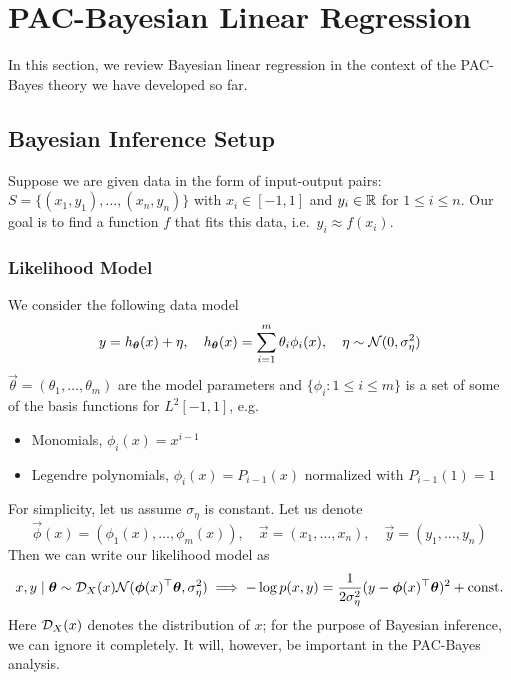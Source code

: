\section{PAC-Bayesian Linear Regression}

In this section, we review Bayesian linear regression in the context of the
PAC-Bayes theory we have developed so far.

\subsection{Bayesian Inference Setup}

Suppose we are given data in the form of input-output pairs: $S = \{(x_1, y_1),
\ldots, (x_n, y_n)\}$ with $x_i \in [-1, 1]$ and $y_i \in \mathbb{R}$ for $1 \leq i
\leq n$. Our goal is to find a function $f$ that fits this data, i.e.\ $y_i
\approx f(x_i)$.

\subsubsection{Likelihood Model}

We consider the following data model
\begin{equation}
  y = h_{\bm{\theta}}(x) + \eta, \quad h_{\bm{\theta}}(x) = \sum_{i = 1}^m
  \theta_i \phi_i(x), \quad \eta \sim \mathcal{N}(0, \sigma_\eta^2)
\end{equation}
$\Vec{\theta} = (\theta_1, \ldots, \theta_m)$ are the model parameters and
$\{\phi_i : 1 \leq i \leq m\}$ is a set of some of the basis functions for
$L^2[-1, 1]$, e.g.
\begin{itemize}
  \item
    Monomials, $\phi_i(x) = x^{i - 1}$
  \item
    Legendre polynomials, $\phi_i(x) = P_{i - 1}(x)$ normalized with $P_{i -
    1}(1) = 1$
\end{itemize}
For simplicity, let us assume $\sigma_\eta$ is constant. Let us denote
\begin{equation}
  \Vec{\phi}(x) = (\phi_1(x), \ldots, \phi_m(x)), \quad \Vec{x} = (x_1, \ldots,
  x_n), \quad \Vec{y} = (y_1, \ldots, y_n)
\end{equation}
Then we can write our likelihood model as
\begin{equation}
  x, y \mid \bm{\theta} \sim \mathcal{D}_X(x) \mathcal{N}(\bm{\phi}(x)^\top
  \bm{\theta}, \sigma_\eta^2) \implies -\log p(x, y) = \frac{1}{2
  \sigma_\eta^2} (y - \bm{\phi}(x)^\top \bm{\theta})^2 + \text{const.}
\end{equation}
Here $\mathcal{D}_X(x)$ denotes the distribution of $x$; for the purpose of Bayesian
inference, we can ignore it completely. It will, however, be important in the
PAC-Bayes analysis.

